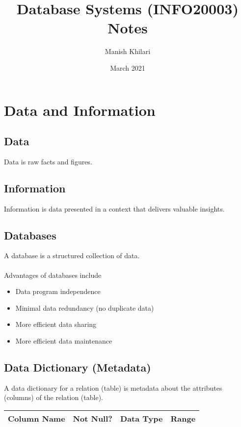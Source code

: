 \documentclass[12pt, a4paper]{article}
\title{Database Systems (INFO20003) Notes}
\author{Manish Khilari}
\date{March 2021}
\begin{document}
    
    \maketitle

    \section{Data and Information}
    \subsection{Data}
    Data is raw facts and figures. 

    \subsection{Information}
    Information is data presented in a context that delivers valuable insights. 

    \subsection{Databases}
    A database is a structured collection of data. \\\\
    Advantages of databases include 
    \begin{itemize}
        \item Data program independence 
        \item Minimal data redundancy (no duplicate data) 
        \item More efficient data sharing 
        \item More efficient data maintenance 
    \end{itemize}

    \subsection{Data Dictionary (Metadata)}
    A data dictionary for a relation (table) is metadata about the attributes 
    (columns) of the relation (table). 
    \begin{center}
        \begin{tabular}{ |c|c|c|c| } 
         \hline
         Column Name & Not Null? & Data Type & Range \\ 
         \hline
        \end{tabular}
    \end{center}
    
\end{document}
